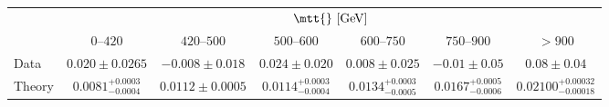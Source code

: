 \begin{table}[!htp]\centering
\begin{tabular}{l c c c c c c}
  \toprule
  &\multicolumn{6}{c}{$\mtt{}~[\rm{GeV}]$}    \\
  \ac{} & $0$--$420$ & $420$--$500$ & $500$--$600$ & $600$--$750$ & $750$--$900$ & $>900$ \\
  \midrule
  Data & $0.020\pm0.0265$ & $-0.008\pm0.018$ & $0.024\pm0.020$ & $0.008\pm0.025$ & $-0.01\pm0.05$ & $0.08\pm0.04$\\
  Theory & $0.0081^{+0.0003}_{-0.0004}$ & $0.0112\pm0.0005$ & $0.0114^{+0.0003}_{-0.0004}$ & $0.0134^{+0.0003}_{-0.0005}$ & $0.0167^{+0.0005}_{-0.0006}$ & $0.02100^{+0.00032}_{-0.00018}$ \\
  \bottomrule
\end{tabular}
\caption{ }
\label{tab:results_mtt}
\end{table}


